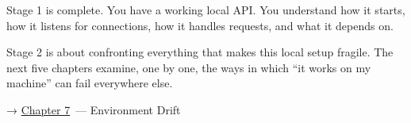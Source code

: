 \label{06-local-dependencies:whats-next}

Stage 1 is complete. You have a working local API. You understand how it starts, how it listens for connections, how it handles requests, and what it depends on.

Stage 2 is about confronting everything that makes this local setup fragile. The next five chapters examine, one by one, the ways in which ``it works on my machine'' can fail everywhere else.

\noindent{}→ \hyperref[ch:07-environment-drift]{Chapter 7}~--- Environment Drift
